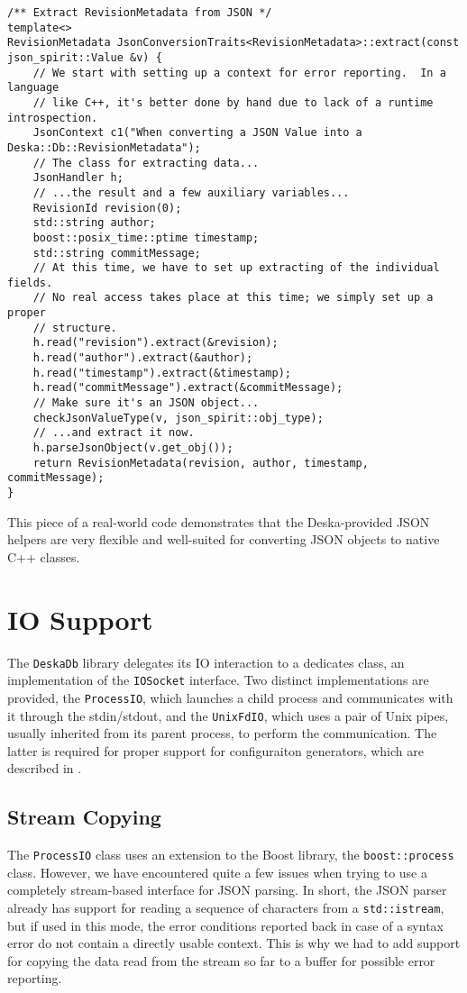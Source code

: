 \documentclass[deska]{subfiles}
\begin{document}
\begin{verbatim}
/** Extract RevisionMetadata from JSON */
template<>
RevisionMetadata JsonConversionTraits<RevisionMetadata>::extract(const json_spirit::Value &v) {
    // We start with setting up a context for error reporting.  In a language
    // like C++, it's better done by hand due to lack of a runtime introspection.
    JsonContext c1("When converting a JSON Value into a Deska::Db::RevisionMetadata");
    // The class for extracting data...
    JsonHandler h;
    // ...the result and a few auxiliary variables...
    RevisionId revision(0);
    std::string author;
    boost::posix_time::ptime timestamp;
    std::string commitMessage;
    // At this time, we have to set up extracting of the individual fields.
    // No real access takes place at this time; we simply set up a proper
    // structure.
    h.read("revision").extract(&revision);
    h.read("author").extract(&author);
    h.read("timestamp").extract(&timestamp);
    h.read("commitMessage").extract(&commitMessage);
    // Make sure it's an JSON object...
    checkJsonValueType(v, json_spirit::obj_type);
    // ...and extract it now.
    h.parseJsonObject(v.get_obj());
    return RevisionMetadata(revision, author, timestamp, commitMessage);
}
\end{verbatim}

This piece of a real-world code demonstrates that the Deska-provided JSON helpers are very flexible and well-suited for
converting JSON objects to native C++ classes.

\section{IO Support}

The {\tt DeskaDb} library delegates its IO interaction to a dedicates class, an implementation of the {\tt IOSocket}
interface.  Two distinct implementations are provided, the {\tt ProcessIO}, which launches a child process and
communicates with it through the stdin/stdout, and the {\tt UnixFdIO}, which uses a pair of Unix pipes, usually
inherited from its parent process, to perform the communication.  The latter is required for proper support for
configuraiton generators, which are described in .

\subsection{Stream Copying}

The {\tt ProcessIO} class uses an extension to the Boost library, the {\tt boost::process} class.  However, we have
encountered quite a few issues when trying to use a completely stream-based interface for JSON parsing.  In short, the
JSON parser already has support for reading a sequence of characters from a {\tt std::istream}, but if used in this
mode, the error conditions reported back in case of a syntax error do not contain a directly usable context.  This is
why we had to add support for copying the data read from the stream so far to a buffer for possible error reporting.
\end{document}

